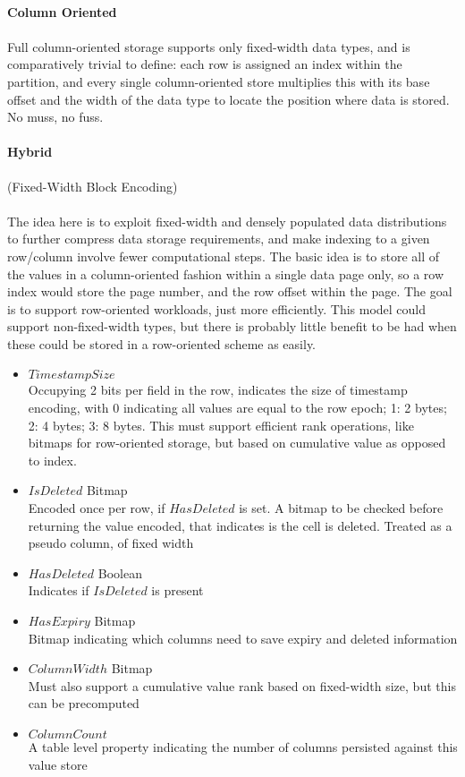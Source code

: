 \documentclass[fleqn]{article}
\begin{document}
\clearpage
\paragraph{Column Oriented}
\paragraph{}
Full column-oriented storage supports only fixed-width data types, and is comparatively trivial to define:
each row is assigned an index within the partition, and every single column-oriented store multiplies this
with its base offset and the width of the data type to locate the position where data is stored. No muss, no fuss.
\paragraph{Hybrid}\normalsize{(Fixed-Width Block Encoding)}
\paragraph{}
\small
The idea here is to exploit fixed-width and densely populated data distributions to further compress
data storage requirements, and make indexing to a given row/column involve fewer computational steps.
The basic idea is to store all of the values in a column-oriented fashion within a single data page only,
so a row index would store the page number, and the row offset within the page. The goal is to support
row-oriented workloads, just more efficiently. This model could support non-fixed-width types, but there
is probably little benefit to be had when these could be stored in a row-oriented scheme as easily.
 \begin{itemize}
  \item $TimestampSize$\\[2pt]
    Occupying 2 bits per field in the row, indicates the size of timestamp encoding, with 0 indicating
    all values are equal to the row epoch; 1: 2 bytes; 2: 4 bytes; 3: 8 bytes.
    This must support efficient rank operations, like bitmaps for row-oriented storage, but based on
    cumulative value as opposed to index.
  \item $IsDeleted$ Bitmap \\[2pt]
    Encoded once per row, if $HasDeleted$ is set. A bitmap to be checked before returning the value
    encoded, that indicates is the cell is deleted. Treated as a pseudo column, of fixed width
  \item $HasDeleted$ Boolean \\[2pt]
    Indicates if $IsDeleted$ is present
  \item $HasExpiry$ Bitmap\\[2pt]
    Bitmap indicating which columns need to save expiry and deleted information
  \item $ColumnWidth$ Bitmap\\[2pt]
    Must also support a cumulative value rank based on fixed-width size, but this can be precomputed
  \item $ColumnCount$\\[2pt]
    A table level property indicating the number of columns persisted against this value store
\end{itemize}
\end{document}
